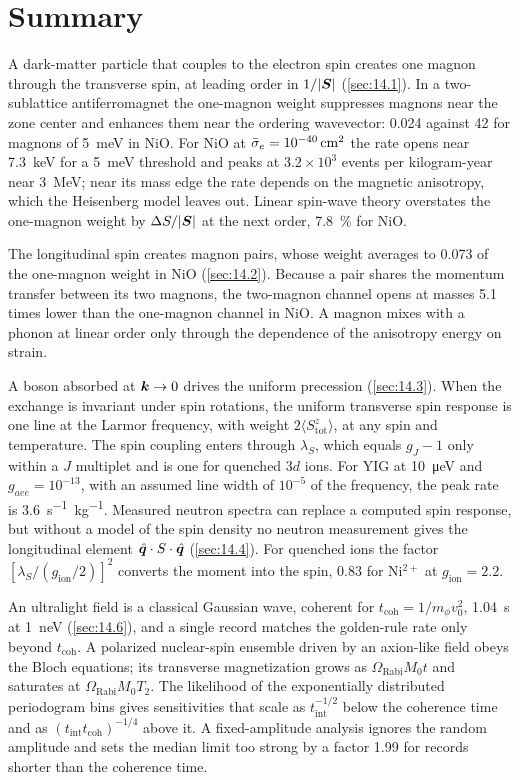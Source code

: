 \section*{Summary}

A dark-matter particle that couples to the electron spin creates one magnon through the transverse spin, at leading order in $1/|\bm{S}|$ (\cref{sec:14.1}). In a two-sublattice antiferromagnet the one-magnon weight suppresses magnons near the zone center and enhances them near the ordering wavevector: 0.024 against 42 for magnons of \SI{5}{meV} in NiO. For NiO at $\bar{\sigma}_{e} = \SI{e-40}{cm^2}$ the rate opens near \SI{7.3}{keV} for a \SI{5}{meV} threshold and peaks at $3.2\times10^3$ events per kilogram-year near \SI{3}{MeV}; near its mass edge the rate depends on the magnetic anisotropy, which the Heisenberg model leaves out. Linear spin-wave theory overstates the one-magnon weight by $\Delta S/|\bm{S}|$ at the next order, \SI{7.8}{\percent} for NiO.

The longitudinal spin creates magnon pairs, whose weight averages to 0.073 of the one-magnon weight in NiO (\cref{sec:14.2}). Because a pair shares the momentum transfer between its two magnons, the two-magnon channel opens at masses 5.1 times lower than the one-magnon channel in NiO. A magnon mixes with a phonon at linear order only through the dependence of the anisotropy energy on strain.

A boson absorbed at $\bm{k} \to 0$ drives the uniform precession (\cref{sec:14.3}). When the exchange is invariant under spin rotations, the uniform transverse spin response is one line at the Larmor frequency, with weight $2\langle S^z_{\mathrm{tot}}\rangle$, at any spin and temperature. The spin coupling enters through $\lambda_S$, which equals $g_J - 1$ only within a $J$ multiplet and is one for quenched $3d$ ions. For YIG at \SI{10}{\micro eV} and $g_{aee} = 10^{-13}$, with an assumed line width of $10^{-5}$ of the frequency, the peak rate is \SI{3.6}{s^{-1}.kg^{-1}}. Measured neutron spectra can replace a computed spin response, but without a model of the spin density no neutron measurement gives the longitudinal element $\hat{\bm{q}}\cdot S\cdot\hat{\bm{q}}$ (\cref{sec:14.4}). For quenched ions the factor $[\lambda_S/(g_{\mathrm{ion}}/2)]^2$ converts the moment into the spin, 0.83 for Ni$^{2+}$ at $g_{\mathrm{ion}} = 2.2$.

An ultralight field is a classical Gaussian wave, coherent for $t_{\mathrm{coh}} = 1/m_\phi v_0^2$, \SI{1.04}{s} at \SI{1}{neV} (\cref{sec:14.6}), and a single record matches the golden-rule rate only beyond $t_{\mathrm{coh}}$. A polarized nuclear-spin ensemble driven by an axion-like field obeys the Bloch equations; its transverse magnetization grows as $\Omega_{\mathrm{Rabi}}M_0t$ and saturates at $\Omega_{\mathrm{Rabi}}M_0T_2$. The likelihood of the exponentially distributed periodogram bins gives sensitivities that scale as $t_{\mathrm{int}}^{-1/2}$ below the coherence time and as $(t_{\mathrm{int}}t_{\mathrm{coh}})^{-1/4}$ above it. A fixed-amplitude analysis ignores the random amplitude and sets the median limit too strong by a factor 1.99 for records shorter than the coherence time.

